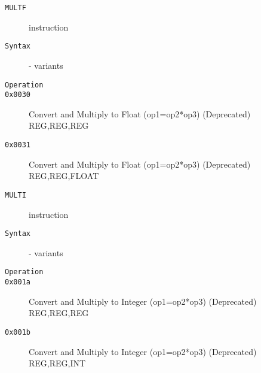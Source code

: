 \clearpage
\begin{description}
\item[\texttt{MULTF}] instruction\\
\item[\texttt{Syntax}] - variants\\

\item[\texttt{Operation}]
\item[\texttt{}]
\item[\texttt{0x0030}] Convert and Multiply to Float (op1=op2*op3) (Deprecated)  {REG,REG,REG}       \\
\item[\texttt{0x0031}] Convert and Multiply to Float (op1=op2*op3) (Deprecated)  {REG,REG,FLOAT}     \\
\end{description}
\clearpage
\begin{description}
\item[\texttt{MULTI}] instruction\\
\item[\texttt{Syntax}] - variants\\

\item[\texttt{Operation}]
\item[\texttt{}]
\item[\texttt{0x001a}] Convert and Multiply to Integer (op1=op2*op3) (Deprecated)  {REG,REG,REG}       \\
\item[\texttt{0x001b}] Convert and Multiply to Integer (op1=op2*op3) (Deprecated)  {REG,REG,INT}       \\
\end{description}
\clearpage
